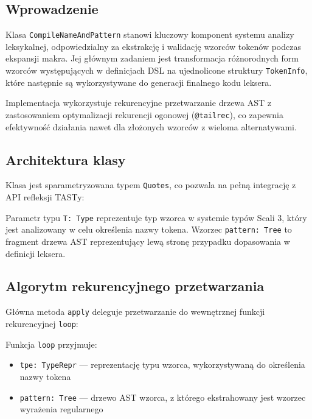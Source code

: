 \subsection{Wprowadzenie}
\label{subsec:cnp-intro}

Klasa \texttt{CompileNameAndPattern} stanowi kluczowy komponent systemu analizy leksykalnej, odpowiedzialny za ekstrakcję i walidację wzorców tokenów podczas ekspansji makra. Jej głównym zadaniem jest transformacja różnorodnych form wzorców występujących w definicjach DSL na ujednolicone struktury \texttt{TokenInfo}, które następnie są wykorzystywane do generacji finalnego kodu leksera.

Implementacja wykorzystuje rekurencyjne przetwarzanie drzewa AST z zastosowaniem optymalizacji rekurencji ogonowej (\texttt{@tailrec}), co zapewnia efektywność działania nawet dla złożonych wzorców z wieloma alternatywami.

\subsection{Architektura klasy}
\label{subsec:cnp-architecture}

Klasa jest sparametryzowana typem \texttt{Quotes}, co pozwala na pełną integrację z API refleksji TASTy:



Parametr typu \texttt{T: Type} reprezentuje typ wzorca w systemie typów Scali 3, który jest analizowany w celu określenia nazwy tokena. Wzorzec \texttt{pattern: Tree} to fragment drzewa AST reprezentujący lewą stronę przypadku dopasowania w definicji leksera.

\subsection{Algorytm rekurencyjnego przetwarzania}
\label{subsec:cnp-algorithm}

Główna metoda \texttt{apply} deleguje przetwarzanie do wewnętrznej funkcji rekurencyjnej \texttt{loop}:

Funkcja \texttt{loop} przyjmuje:
\begin{itemize}
    \item \texttt{tpe: TypeRepr} --- reprezentację typu wzorca, wykorzystywaną do określenia nazwy tokena
    \item \texttt{pattern: Tree} --- drzewo AST wzorca, z którego ekstrahowany jest wzorzec wyrażenia regularnego
\end{itemize}

